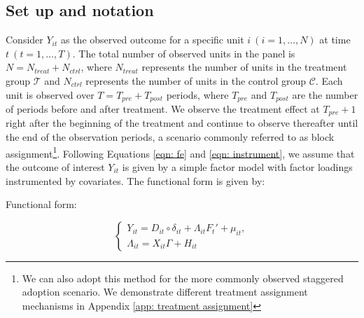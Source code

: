 \documentclass[12pt]{article}
\begin{document}
\subsection{Set up and notation} 
\label{sec: set up}
Consider $Y_{it}$ as the observed outcome for a specific unit $i \ (i = 1, \dots, N)$ at time $t \ (t = 1, \dots, T)$. The total number of observed units in the panel is $N = N_{treat} + N_{ctrl}$, where $N_{treat}$ represents the number of units in the treatment group $\mathcal{T}$ and $N_{ctrl}$ represents the number of units in the control group $\mathcal{C}$. Each unit is observed over $T = T_{pre} + T_{post}$ periods, where $T_{pre}$ and $T_{post}$ are the number of periods before and after treatment. We observe the treatment effect at $T_{pre} + 1$ right after the beginning of the treatment and continue to observe thereafter until the end of the observation periods, a scenario commonly referred to as block assignment\footnote{We can also adopt this method for the more commonly observed staggered adoption scenario. We demonstrate different treatment assignment mechanisms in Appendix \ref{app: treatment assignment}}. Following Equations \ref{eqn: fe} and \ref{eqn: instrument}, we assume that the outcome of interest $Y_{it}$ is given by a simple factor model with factor loadings instrumented by covariates. The functional form is given by:

\begin{assumption}
    Functional form:
    \label{ass: function}
\end{assumption}
    
\begin{equation}
    \begin{cases}
    Y_{it} = D_{it} \circ \delta_{it} + \Lambda_{it}F_{t}' + \mu_{it}, \\
    \Lambda_{it} = X_{it}\Gamma + H_{it}
    \end{cases}
    \label{eqn: functional form}
\end{equation}
\end{document}
